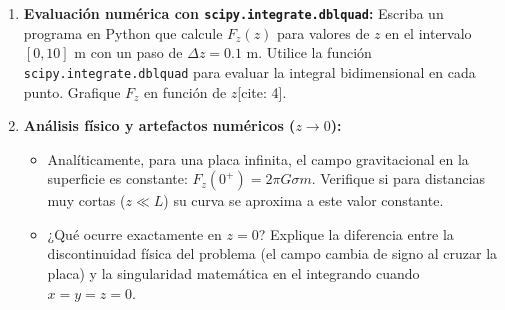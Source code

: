 \documentclass[12pt]{article}
\begin{document}
\begin{problemas}[]
\begin{enumerate}[leftmargin=*]
\begin{enumerate}[label=\textbf{\alph*)}]
    \item \textbf{Evaluación numérica con \texttt{scipy.integrate.dblquad}:}
    Escriba un programa en Python que calcule $F_z(z)$ 
    para valores de $z$ en el intervalo $[0, 10]\text{ m}$ 
    con un paso de $\Delta z = 0.1\text{ m}$. 
    Utilice la función \texttt{scipy.integrate.dblquad} 
    para evaluar la integral bidimensional en cada punto. 
    Grafique $F_z$ en función de $z$[cite: 4].

    \item \textbf{Análisis físico y artefactos numéricos ($z \to 0$):}
    \begin{itemize}
        \item Analíticamente, para una placa infinita, el campo 
        gravitacional en la superficie es constante: 
        $F_z(0^+) = 2\pi G \sigma m$. Verifique si para distancias 
        muy cortas ($z \ll L$) su curva se aproxima a este valor 
        constante.
        \item ¿Qué ocurre exactamente en $z = 0$? 
        Explique la diferencia entre la discontinuidad física del 
        problema (el campo cambia de signo al cruzar la placa) y 
        la singularidad matemática en el integrando cuando 
        $x=y=z=0$.
    \end{itemize}
\end{enumerate}

    \begin{center}
\end{center}
\end{enumerate}
\end{problemas}
\end{document}
